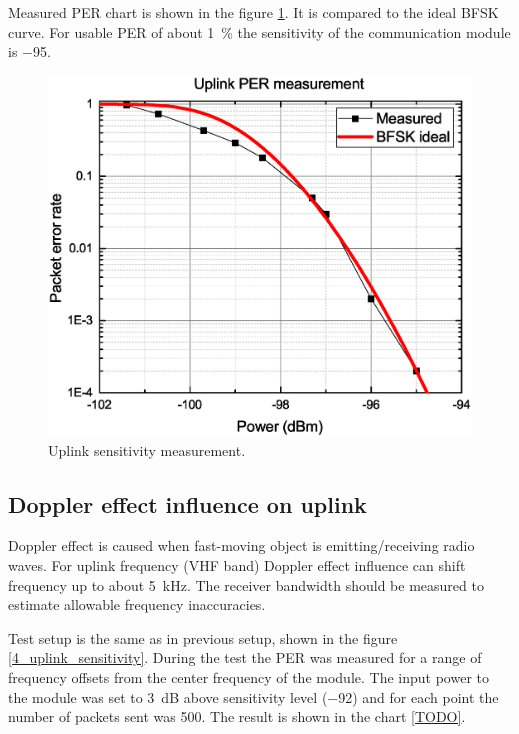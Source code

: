 Measured PER chart is shown in the figure \ref{4_uplink_sensitivity_graph}. It is compared to the ideal BFSK curve. For usable PER of about \SI{1}{\percent} the sensitivity of the communication module is \SI{-95}{\dBm}.

\begin{figure}[H]
    \centering
    \includegraphics[width=0.8\paperwidth]{img/4/uplink_per.eps}
    \caption{Uplink sensitivity measurement.}
    \label{4_uplink_sensitivity_graph}
\end{figure}


\subsection{Doppler effect influence on uplink}
Doppler effect is caused when fast-moving object is emitting/receiving radio waves. For uplink frequency (VHF band) Doppler effect influence can shift frequency up to about \SI{5}{\kHz}. The receiver bandwidth should be measured to estimate allowable frequency inaccuracies.

Test setup is the same as in previous setup, shown in the figure \ref{4_uplink_sensitivity}. During the test the PER was measured for a range of frequency offsets from the center frequency of the module. The input power to the module was set to \SI{3}{\dB} above sensitivity level (\SI{-92}{\dBm}) and for each point the number of packets sent was \si{500}.  The result is shown in the chart \ref{TODO}.

